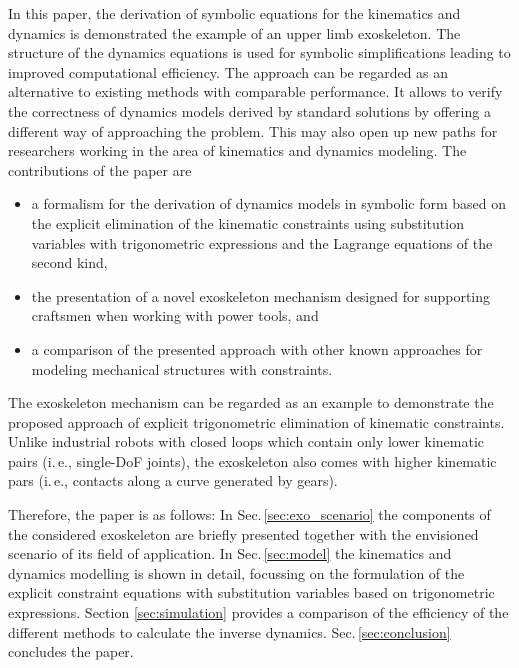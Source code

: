 \documentclass{svproc}
\begin{document}
In this paper, the derivation of symbolic equations for the kinematics and dynamics is demonstrated  the example of an upper limb exoskeleton.
The structure of the dynamics equations is used for symbolic simplifications leading to improved computational efficiency.
The approach can be regarded as an alternative to existing methods with comparable performance.
It allows to verify the correctness of dynamics models derived by standard solutions by offering a different way of approaching the problem.
This may also open up new paths for researchers working in the area of kinematics and dynamics modeling. 
The contributions of the paper are

\vspace{-0.20cm}

\begin{itemize}
    \item a formalism for the derivation of dynamics models in symbolic form based on the explicit elimination of the kinematic constraints using substitution variables with trigonometric expressions and the Lagrange equations of the second kind,
    \item the presentation of a novel exoskeleton mechanism designed for supporting craftsmen when working with power tools, and
    \item a comparison of the presented approach with other known approaches for modeling mechanical structures with constraints.
\end{itemize}
\vspace{-0.25cm}
The exoskeleton mechanism can be regarded as an example to demonstrate the proposed approach of explicit trigonometric elimination of kinematic constraints.
Unlike industrial robots with closed loops which contain only lower kinematic pairs (i.\,e., single-DoF joints), the exoskeleton also comes with higher kinematic pars (i.\,e., contacts along a curve generated by gears).

Therefore, the paper is  as follows:
In Sec.\,\ref{sec:exo_scenario} the components of the considered exoskeleton are briefly presented together with the envisioned scenario of its field of application. In Sec.\,\ref{sec:model} the kinematics and dynamics modelling is shown in detail, focussing on the formulation of the explicit constraint equations with substitution variables based on trigonometric expressions.
Section \ref{sec:simulation} provides a comparison of the efficiency of the different methods to calculate the inverse dynamics. Sec.\,\ref{sec:conclusion} concludes the paper.
\end{document}
